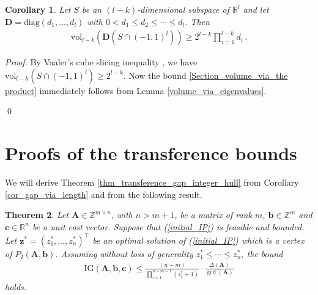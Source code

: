 \documentclass[runningheads]{llncs}
\newcommand{\ve}{\boldsymbol}
\newtheorem{thm}{Theorem}
\newtheorem{cor}[thm]{Corollary}
\newcommand{\be}{\begin{eqnarray}}
\newcommand{\bea}{\begin{eqnarray*}}
\newcommand{\ee}{\end{eqnarray}}
\newcommand{\eea}{\end{eqnarray*}}
\newcommand{\diag}{\mathrm{diag}}
\newcommand{\vol}{\mathrm{vol}}
\newcommand{\R}{\mathbb R}
\newcommand{\Z}{\mathbb Z}
\newcommand{\KP}{{P}}
\renewcommand\>{\rangle}
\newcommand\<{\langle}
\newcommand\0{\mathbf{0}}
\newcommand\bb{\ve b}%
\newcommand\cc{\ve c}%
\newcommand\zz{\ve z}%
\newcommand\BB{\ve B}%
\renewcommand\AA{\ve A}%
\newcommand\DD{\ve D}%
\newcommand\IG{\mathrm{IG}}%
\begin{document}
%


\begin{cor} \label{coro_section_volume_via_B} Let $S$ be an $(l-k)$-dimensional subspace of $\R^l$ and let  $\DD=\diag(d_1,\ldots, d_l)$ with $0<d_1\le d_2\le \cdots\le d_l$. Then
\be\label{Section_volume_via_the product} \vol_{l-k}(\DD(S\cap (-1,1)^l))\ge 2^{l-k}\prod_{i=1}^{l-k} d_i\,.\ee
\end{cor}

\begin{proof}
By Vaaler's cube slicing inequality \cite{Vaaler1979}, we have $\vol_{l-k}(S\cap (-1,1)^l)\ge 2^{l-k}$.
Now the bound \eqref{Section_volume_via_the product} immediately follows from Lemma \ref{volume_via_eigenvalues}.

\qed\end{proof}


%





\section{Proofs of the transference bounds}


We will derive Theorem  \ref{thm_transference_gap_integer_hull} from Corollary \ref{cor_gap_via_length}  and from the following result. %
%
\begin{thm} \label{thm_gap_integer_hull} Let $\AA\in \Z^{m\times n}$, with $n>m+1$, be a matrix of rank $m$, $\bb\in \Z^m$ and $\cc\in \R^n$ be a unit cost vector. Suppose that (\ref{initial_IP}) is feasible and bounded. Let $\zz^*=(z_1^*,\ldots, z_n^*)^\top$ be an optimal solution of (\ref{initial_IP}) which is a vertex of $\KP_I(\AA,\bb)$. Assuming without loss of generality $z_1^*\le\cdots\le z_n^*$, the bound
\be\label{Gap_transference_integer_hull_advanced} 
\IG(\AA,\bb,\cc)\le\frac{(n-m)}{\prod_{i=1}^{n-m-1}(z_i^*+1)}\cdot\frac{\Delta(\AA)}{\gcd(\AA)}
\ee
holds.
\end{thm}
\end{document}
